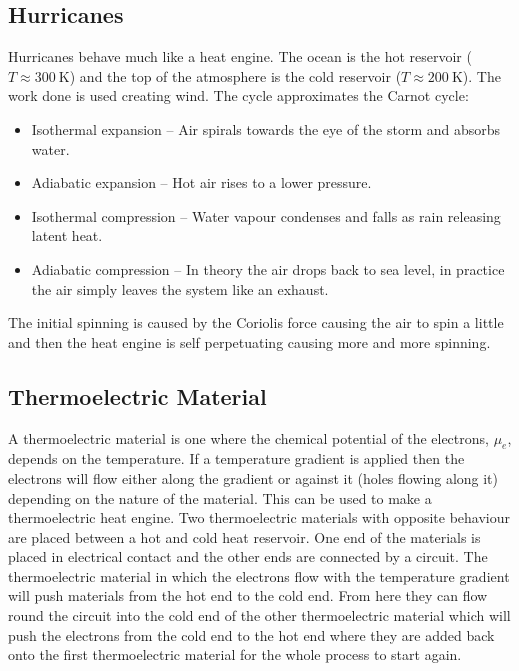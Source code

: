     \subsection{Hurricanes}
    Hurricanes behave much like a heat engine.
    The ocean is the hot reservoir (\(T \approx \SI{300}{\kelvin}\)) and the top of the atmosphere is the cold reservoir (\(T \approx \SI{200}{\kelvin}\)).
    The work done is used creating wind.
    The cycle approximates the Carnot cycle:
    \begin{itemize}
        \item Isothermal expansion -- Air spirals towards the eye of the storm and absorbs water.
        \item Adiabatic expansion -- Hot air rises to a lower pressure.
        \item Isothermal compression -- Water vapour condenses and falls as rain releasing latent heat.
        \item Adiabatic compression -- In theory the air drops back to sea level, in practice the air simply leaves the system like an exhaust.
    \end{itemize}
    The initial spinning is caused by the Coriolis force causing the air to spin a little and then the heat engine is self perpetuating causing more and more spinning.
    
    \subsection{Thermoelectric Material}
    A thermoelectric material is one where the chemical potential of the electrons, \(\mu_e\), depends on the temperature.
    If a temperature gradient is applied then the electrons will flow either along the gradient or against it (holes flowing along it) depending on the nature of the material.
    This can be used to make a thermoelectric heat engine.
    Two thermoelectric materials with opposite behaviour are placed between a hot and cold heat reservoir.
    One end of the materials is placed in electrical contact and the other ends are connected by a circuit.
    The thermoelectric material in which the electrons flow with the temperature gradient will push materials from the hot end to the cold end.
    From here they can flow round the circuit into the cold end of the other thermoelectric material which will push the electrons from the cold end to the hot end where they are added back onto the first thermoelectric material for the whole process to start again.